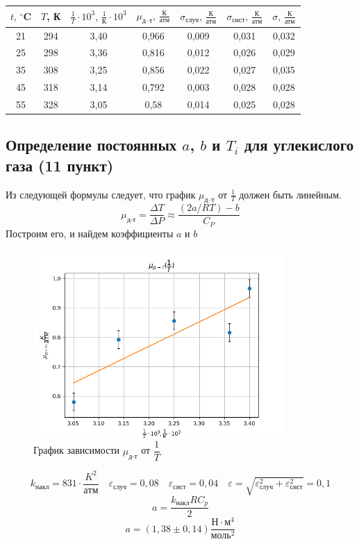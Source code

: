 \documentclass[a4paper,12pt]{article}
\begin{document}
\begin{table}[!ht]
    \centering
    \begin{tabular}{|c|c|c|c|c|c|c|}
    \hline
        $t\text{, }^\circ$C & $T$, К & $\frac{1}{T} \cdot 10^3 \text{, } \frac{1}{\text{К}} \cdot 10^3$ & $\mu_\text{д--т} \text{, } \frac{\text{К}}{\text{атм}}$ & $\sigma_{случ} \text{, } \frac{\text{К}}{\text{атм}}$ & $\sigma_{сист} \text{, } \frac{\text{К}}{\text{атм}}$ & $\sigma \text{, } \frac{\text{К}}{\text{атм}}$ \\ \hline
        21 & 294 & 3,40 & 0,966 & 0,009 & 0,031 & 0,032  \\ \hline
        25 & 298 & 3,36 & 0,816 & 0,012 & 0,026 & 0,029  \\ \hline
        35 & 308 & 3,25 & 0,856 & 0,022 & 0,027 & 0,035  \\ \hline
        45 & 318 & 3,14 & 0,792 & 0,003 & 0,028 & 0,028  \\ \hline
        55 & 328 & 3,05 & 0,58 & 0,014 & 0,025 & 0,028 \\ \hline
    \end{tabular}
\end{table}

\subsection*{Определение постоянных $a$, $b$ и $T_i$ для углекислого газа (11 пункт)}
Из следующей формулы следует, что график $\mu_\text{д--т} \text{ от } \frac{1}{T}$ должен быть линейным. 
    \[ \mu_\text{д-т} = \frac{\Delta T}{\Delta P} \approx \frac{(2a/RT) - b}{C_P} \]
Построим его, и найдем коэффициенты $a \text{ и } b$
    
\begin{figure}[H]
    \centering
    \includegraphics[width=0.85\textwidth]{6.png}
    \caption{График зависимости $\mu_\text{д-т}$ от $\dfrac{1}{T}$}
\end{figure}
\[ k_{накл} = 831 \cdot \dfrac{K^2}{атм} \quad \varepsilon_{случ} = 0,08 \quad \varepsilon_{сист} = 0,04 \quad \varepsilon = \sqrt{\varepsilon_{случ}^2 + \varepsilon_{сист}^2} = 0,1\]
\[ a = \dfrac{k_{накл}RC_p}{2} \]
\[ a = (1,38 \pm 0,14) \dfrac{Н \cdot м^4}{\text{моль}^2} \]
\end{document}

